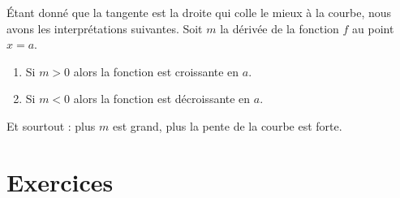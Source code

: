 Étant donné que la tangente est la droite qui colle le mieux à la courbe, nous avons les interprétations suivantes. Soit \( m\) la dérivée de la fonction \( f\) au point \( x=a\).
\begin{enumerate}
    \item
        Si \( m>0\) alors la fonction est croissante en \( a\).
    \item
        Si \( m<0\) alors la fonction est décroissante en \( a\).
\end{enumerate}
Et sourtout : plus \( m\) est grand, plus la pente de la courbe est forte.

\section{Exercices}

